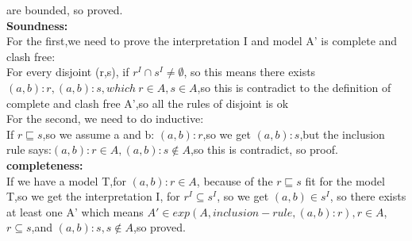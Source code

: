 \documentclass{article}
\begin{document}
    are bounded, so proved.\\
    \textbf{Soundness:}\\
    For the first,we need to prove the interpretation I and model A' is complete and clash free:\\
    For every disjoint (r,s), if $r^I \cap s ^I \neq \emptyset$, so this means there exists $(a,b):r,(a,b):s,which\ r \in A,s\in A$,so this is 
    contradict to the definition of complete and clash free A',so all the rules of disjoint is ok\\
    For the second, we need to do inductive:\\
    If $r \sqsubseteq s$,so we assume a and b: $(a,b):r$,so we get $(a,b):s$,but the inclusion rule says:$(a,b):r\in A, (a,b):s\notin A$,so this is contradict, so proof.\\
    \textbf{completeness:}\\
    If we have a model T,for $(a,b):r\in A$, because of the $r \sqsubseteq s$ fit for the model T,so we get the interpretation I, for $r^I \subseteq s^I$, so we
    get $(a,b)\in s^I$, so there exists at least one A' which means $A' \in exp(A,inclusion-rule,(a,b):r),r\in A$,$r \subseteq s$,and $(a,b):s,s \notin A$,so proved.
\end{document}
